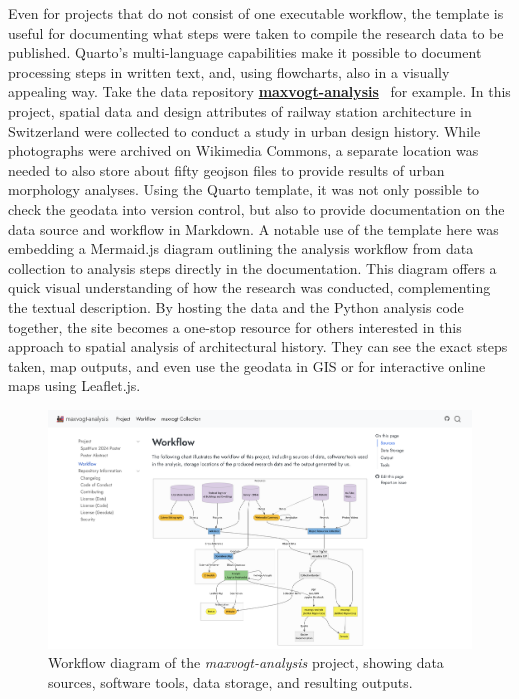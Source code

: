 \documentclass[final]{anthology-ch} %
\begin{document}
Even for projects that do not consist of one executable workflow, the template is useful for documenting what steps were taken to compile the research data to be published. Quarto's multi-language capabilities make it possible to document processing steps in written text, and, using flowcharts, also in a visually appealing way. Take the data repository \href{https://mtwente.github.io/maxvogt-analysis}{\textbf{maxvogt-analysis}}~\cite{twente2024} for example. In this project, spatial data and design attributes of railway station architecture in Switzerland were collected to conduct a study in urban design history. While photographs were archived on Wikimedia Commons, a separate location was needed to also store about fifty geojson files to provide results of urban morphology analyses. Using the Quarto template, it was not only possible to check the geodata into version control, but also to provide documentation on the data source and workflow in Markdown. A notable use of the template here was embedding a Mermaid.js diagram outlining the analysis workflow from data collection to analysis steps directly in the documentation. This diagram offers a quick visual understanding of how the research was conducted, complementing the textual description. By hosting the data and the Python analysis code together, the site becomes a one-stop resource for others interested in this approach to spatial analysis of architectural history. They can see the exact steps taken, map outputs, and even use the geodata in GIS or for interactive online maps using Leaflet.js.

\begin{figure}[t!]
  \centering
  \includegraphics[width=0.9\linewidth]{figures/maxvogt_analysis.png}
  \caption{Workflow diagram of the \emph{maxvogt-analysis} project, showing data sources, software tools, data storage, and resulting outputs.}
  \label{fig-max-vogt}
\end{figure}
\end{document}

